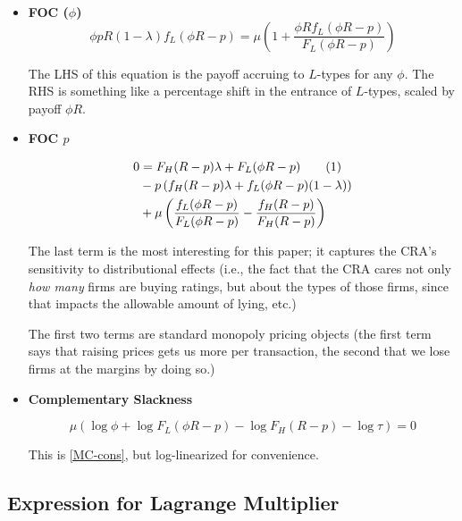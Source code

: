 \documentclass{article}
\newcommand\numberthis{\addtocounter{equation}{1}\tag{\theequation}}
\theoremstyle{definition}
\begin{document}
\begin{itemize}
    \item \textbf{FOC ($\phi$)}
    \begin{equation}
        \label{FOC-phi}
        \phi p R (1 - \lambda)f_L(\phi R - p) = \mu \left(1 + \frac{\phi R f_L(\phi R - p)}{F_L(\phi R - p)}\right)
    \end{equation}

    The LHS of this equation is the payoff accruing to $L$-types for any $\phi$. The RHS is something like a percentage shift in the entrance of $L$-types, scaled by payoff $\phi R$. 

    \item \textbf{FOC $p$}
    
    \begin{align*}
        0 &= F_H (R - p)\lambda + F_L(\phi R - p) \numberthis \label{FOC-p}  \\ 
        &- p\left(f_H(R - p)\lambda + f_L(\phi R - p)(1 - \lambda) \right) \\ 
        &+ \mu \left(\frac{f_L (\phi R - p)}{F_L (\phi R - p)} - \frac{f_H(R - p)}{F_H(R - p)}\right)
    \end{align*}

    The last term is the most interesting for this paper; it captures the CRA's sensitivity to distributional effects (i.e., the fact that the CRA cares not only \emph{how many} firms are buying ratings, but about the types of those firms, since that impacts the allowable amount of lying, etc.)

    The first two terms are standard monopoly pricing objects (the first term says that raising prices gets us more per transaction, the second that we lose firms at the margins by doing so.)

    \item \textbf{Complementary Slackness}
    
    \begin{equation}
        \label{slackness}
        \mu(\log \phi + \log F_L(\phi R - p) - \log F_H(R - p) - \log \tau) = 0
    \end{equation}

    This is \eqref{MC-cons}, but log-linearized for convenience.
\end{itemize}

\subsection{Expression for Lagrange Multiplier}
\end{document}

